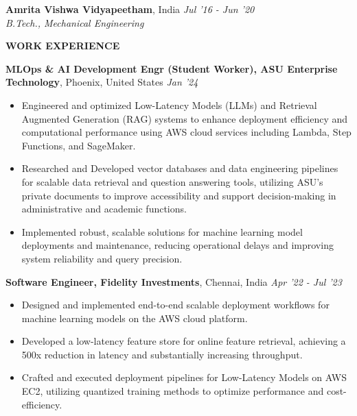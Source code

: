 \documentclass[10pt,a4]{article}
\def\hrulefill{\leavevmode\leaders\hrule height 1pt\hfill\kern 0pt}		%
\begin{document}
{\begin{flushleft}

    
    \textbf{\large Amrita Vishwa Vidyapeetham}, \large India \tab  \hfill \textit{\large Jul '16 - Jun '20}	\\
        \hspace{0.5 cm}\textit{\large B.Tech., Mechanical Engineering}

\end{flushleft}
		
		
		
\begin{flushleft}
		{\Large \textbf{WORK EXPERIENCE}} %
  
        \vspace{1.5mm}
        \textbf{\large MLOps \& AI Development Engr (Student Worker), ASU Enterprise Technology},  \large Phoenix, United States \hfill \textit{\large Jan '24}	\\
		\begin{itemize}
            \item Engineered and optimized Low-Latency Models (LLMs) and Retrieval Augmented Generation (RAG) systems to enhance deployment efficiency and computational performance using AWS cloud services including Lambda, Step Functions, and SageMaker.
            \item Researched and Developed vector databases and data engineering pipelines for scalable data retrieval and question answering tools, utilizing ASU’s private documents to improve accessibility and support decision-making in administrative and academic functions.
            \item Implemented robust, scalable solutions for machine learning model deployments and maintenance, reducing operational delays and improving system reliability and query precision.
        \end{itemize}	
        \vspace{0.5mm}
        \textbf{\large Software Engineer, Fidelity Investments},  \large Chennai, India \hfill \textit{\large Apr '22 - Jul '23}	\\
		\begin{itemize}
            \item Designed and implemented end-to-end scalable deployment workflows for machine learning models on the AWS cloud platform.  
             \item Developed a low-latency feature store for online feature retrieval, achieving a 500x reduction in latency and substantially increasing throughput.
             \item Crafted and executed deployment pipelines for Low-Latency Models on AWS EC2, utilizing quantized training methods to optimize performance and cost-efficiency. 
		\end{itemize}	
  

\end{flushleft}}
\end{document}
